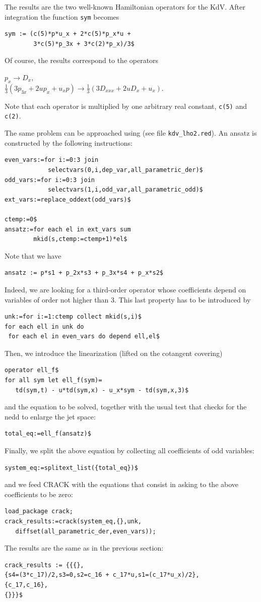 The results are the two well-known Hamiltonian operators for the KdV.
After integration the function \texttt{sym} becomes
\begin{verbatim}
sym := (c(5)*p*u_x + 2*c(5)*p_x*u +
        3*c(5)*p_3x + 3*c(2)*p_x)/3$
\end{verbatim}
Of course, the results correspond to the operators
\begin{center}
  $p_x \to D_x$,\\
  $\displaystyle\frac{1}{3}(3p_{3x} + 2up_x + u_xp) \to \frac{1}{3}(3D_{xxx} + 2uD_{x} + u_x)$.
\end{center}
Note that each operator is multiplied by one arbitrary real
constant, \texttt{c(5)} and \texttt{c(2)}.

The same problem can be approached using   (see file
\texttt{kdv\_lho2.red}). An ansatz is constructed by the following
instructions:
\begin{verbatim}
even_vars:=for i:=0:3 join
            selectvars(0,i,dep_var,all_parametric_der)$
odd_vars:=for i:=0:3 join
            selectvars(1,i,odd_var,all_parametric_odd)$
ext_vars:=replace_oddext(odd_vars)$

ctemp:=0$
ansatz:=for each el in ext_vars sum
        mkid(s,ctemp:=ctemp+1)*el$
\end{verbatim}
Note that we have
\begin{verbatim}
ansatz := p*s1 + p_2x*s3 + p_3x*s4 + p_x*s2$
\end{verbatim}
Indeed, we are looking for a third-order operator whose coefficients depend on
variables of order not higher than $3$. This last property has to be introduced
by
\begin{verbatim}
unk:=for i:=1:ctemp collect mkid(s,i)$
for each ell in unk do
 for each el in even_vars do depend ell,el$
\end{verbatim}
Then, we introduce the linearization (lifted on the cotangent covering)
\begin{verbatim}
operator ell_f$
for all sym let ell_f(sym)=
   td(sym,t) - u*td(sym,x) - u_x*sym - td(sym,x,3)$
\end{verbatim}
and the equation to be solved, together with the usual test that checks for the
nedd to enlarge the jet space:
\begin{verbatim}
total_eq:=ell_f(ansatz)$
\end{verbatim}
Finally, we split the above equation by collecting all coefficients of odd
variables:
\hypertarget{operator:SPLITEXT_LIST}{}
\begin{verbatim}
system_eq:=splitext_list({total_eq})$
\end{verbatim}
and we feed CRACK with the equations that consist in asking to the above
coefficients to be zero:
\begin{verbatim}
load_package crack;
crack_results:=crack(system_eq,{},unk,
   diffset(all_parametric_der,even_vars));
\end{verbatim}
The results are the same as in the previous section:
\begin{verbatim}
crack_results := {{{},
{s4=(3*c_17)/2,s3=0,s2=c_16 + c_17*u,s1=(c_17*u_x)/2},
{c_17,c_16},
{}}}$
\end{verbatim}


